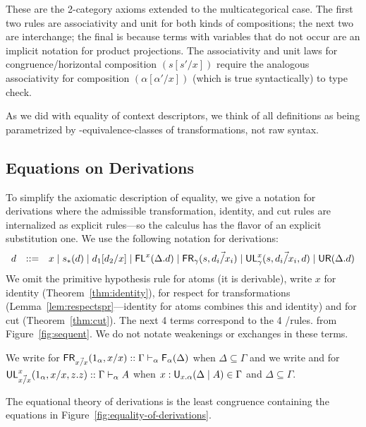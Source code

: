 \noindent These are the 2-category axioms extended to the
multicategorical case.  The first two rules are associativity and unit
for both kinds of compositions; the next two are interchange; the final
is because terms with variables that do not occur are an implicit
notation for product projections.  The associativity and unit laws for
congruence/horizontal composition $(s[s'/x])$ require the analogous
associativity for composition $(\alpha[\alpha'/x])$ (which is true
syntactically) to type check.

As we did with equality of context descriptors, we think of all
definitions as being parametrized by \deq-equivalence-classes of
transformations, not raw syntax.

\subsection{Equations on Derivations}

To simplify the axiomatic description of equality, we give a notation
for derivations where the admissible
transformation, identity, and cut rules are internalized as explicit
rules---so the calculus has the flavor of an explicit substitution one.
We use the following notation for derivations:
\[
\begin{array}{rcl}
d & ::= & {x} \mid s_*(d) \mid d_1[d_2/x] \mid
 \mathsf{FL}^{x}(\Delta.d) \mid \mathsf{FR}_{\gamma}(s,\vec{d_i/x_i}) \mid \mathsf{UL}^{x}_{\gamma}(s,\vec{d_i/x_i},d) \mid \mathsf{UR}(\Delta.d) 
\end{array}
\]
We omit the primitive hypothesis rule for atoms (it is derivable),
write $x$ for identity (Theorem~\ref{thm:identity}),  for
respect for transformations (Lemma~\ref{lem:respectspr}---identity for
atoms combines this and identity) and  for cut
(Theorem~\ref{thm:cut}).  The next 4 terms correspond to the 4
\Usymb/\Fsymb rules.  from Figure~\ref{fig:sequent}.  
We do not notate weakenings or exchanges in these terms.

We write \FRs\/ for $\mathsf{FR}_{\vec{x/x}}(1_\alpha,{x}/x) ::
\Gamma \vdash_{\alpha} \mathsf{F}_{\alpha}(\Delta)$ when $\Delta \subseteq \Gamma$
and we write and  for $\mathsf{UL}^{x}_{\vec{x/x}}(1_\alpha,{x}/x,z.z) ::
\Gamma \vdash_{\alpha} A$ when $x:\mathsf{U}_{x.\alpha}(\Delta \mid A) \in \Gamma$ and
$\Delta \subseteq \Gamma$.  

The equational theory of derivations is the least congruence containing
the equations in Figure~\ref{fig:equality-of-derivations}.

